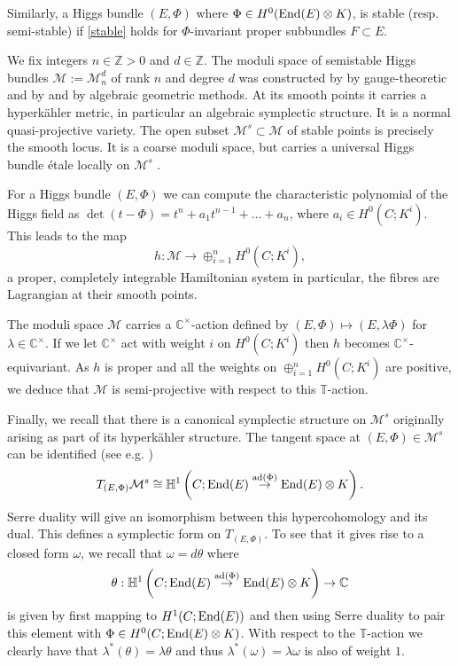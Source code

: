 \documentclass[12pt]{article}
\numberwithin{equation}{section}
\theoremstyle{remark}
\theoremstyle{definition}
\numberwithin{theorem}{section}
\def\beq{\begin{eqnarray}}
\def\eeq{\end{eqnarray}}
\def\C{\mathbb{C}}
\def\M{{\mathcal{M}}}
\newcommand{\T}{{\mathbb{T}}}
\def\Z{\mathbb{Z}}
\newcommand{\ad}{\textnormal{ad}}
\newcommand{\End}{\textnormal{End}}
\renewcommand{\1}{\mathbbm{1}}
\renewcommand{\H}{\mathbb{H}}
\begin{document}
Similarly, a Higgs bundle $(E,\Phi)$ where $\Phi\in H^0(\End(E)\otimes K)$, is stable (resp. semi-stable) if \eqref{stable} holds for $\Phi$-invariant proper subbundles $F\subset E$. 

We fix integers $n\in \Z>0$ and $d\in \Z$.	The moduli space of semistable Higgs bundles $\M:=\M_{n}^{d}$ of rank $n$ and degree $d$ was constructed by \cite{hitchin} by gauge-theoretic and by \cite{nitsure} and \cite{simpson1} by algebraic geometric methods.  At its smooth points it carries a hyperk\"ahler metric, in particular an algebraic symplectic structure. It is  a normal \cite[Corollary 11.7]{simpson1b} quasi-projective variety. The open subset $\M^s\subset \M$ of stable points is precisely the smooth locus.  It is a coarse moduli space, but carries a universal Higgs bundle  \'etale locally on $\M^s$ \cite[Theorem 4.5.(4)]{simpson1}. 

For a Higgs bundle $(E,\Phi)$ we can compute the characteristic polynomial of the Higgs field as $\det(t-\Phi)=t^n+a_{1}t^{n-1}+\dots+a_n$, where $a_i\in H^0(C;K^i)$. This leads to the  map $$h:\M\to \oplus_{i=1}^n  H^0(C;K^i),$$ a proper, completely integrable Hamiltonian system \cite{hitchin-stable,simpson,nitsure} in particular, the fibres are Lagrangian at their smooth points. 

The moduli space $\M$ carries a $\C^\times$-action defined by $(E,\Phi)\mapsto (E,\lambda\Phi)$ for $\lambda\in \C^\times$. If we let $\C^\times$ act with weight $i$ on  $H^0(C;K^i)$ then $h$ becomes $\C^\times$-equivariant. As $h$ is proper and all the weights on $\oplus_{i=1}^n  H^0(C;K^i)$ are positive, we  deduce that $\M$ is semi-projective with respect to this $\T$-action. 

Finally, we recall that there is a canonical symplectic structure on $\M^s$ originally arising as part of its hyperk\"ahler structure. The tangent space at $(E,\Phi)\in \M^s$ can be identified (see e.g. \cite{biswas-ramanan})
\beq\label{tangent} T_{(E,\Phi)}\M^s\cong \H^1\left(C;\End(E)\stackrel{\ad(\Phi)}{\to} \End(E)\otimes K\right).\eeq Serre duality will give an isomorphism between this hypercohomology and its dual. This defines a symplectic form on $T_{(E,\Phi)}$. To see that it gives rise to a closed form $\omega$, we recall \cite[Theorem 4.3]{biswas-ramanan} that $\omega=d\theta$ where $$\theta:\H^1\left(C;\End(E)\stackrel{\ad(\Phi)}{\to}\End(E)\otimes K\right)\to \C$$ is given by first mapping to $H^1(C;\End(E))$ and then using  Serre duality to pair this element with $\Phi\in H^0(C;\End(E)\otimes K)$.  With respect to the $\T$-action we clearly have that $\lambda^*(\theta)=\lambda\theta$ and thus $\lambda^*(\omega)=\lambda\omega$ is also of weight $1$. 
\end{document}
